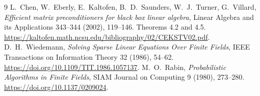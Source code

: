 \documentclass[11pt]{article}
\begin{document}
\begin{thebibliography}{9}
 L.~Chen, W.~Eberly, E.~Kaltofen, B.~D.~Saunders,
W.~J.~Turner, G.~Villard,
\emph{Efficient matrix preconditioners for black box linear algebra},
Linear Algebra and its Applications 343--344 (2002), 119--146.
Theorems 4.2 and 4.5.
\url{https://kaltofen.math.ncsu.edu/bibliography/02/CEKSTV02.pdf}.
 D.~H.~Wiedemann,
\emph{Solving Sparse Linear Equations Over Finite Fields},
IEEE Transactions on Information Theory 32 (1986), 54--62.
\url{https://doi.org/10.1109/TIT.1986.1057137}.
 M.~O.~Rabin,
\emph{Probabilistic Algorithms in Finite Fields},
SIAM Journal on Computing 9 (1980), 273--280.
\url{https://doi.org/10.1137/0209024}.
\end{thebibliography}
\end{document}
